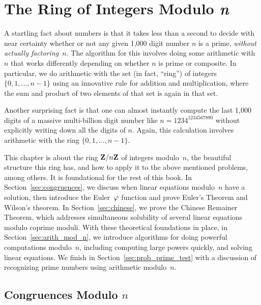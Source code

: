 \chapter{The Ring of Integers Modulo {\em n}}\label{ch:cong}
A startling fact about numbers is that it takes less than a second to
decide with near certainty whether or not any given 1,000 digit number
$n$ is a prime, {\em without actually factoring~$n$}.  The algorithm
for this involves doing some arithmetic with $n$ that works
differently depending on whether $n$ is prime or composite.  In
particular, we do arithmetic with the set (in fact, ``ring'') of
integers $\{0,1,\ldots, n-1\}$ using an innovative rule for addition
and multiplication, where the sum and product of two elements of that
set is again in that set.

Another surprising fact is that one can almost instantly compute the
last 1,000 digits of a massive multi-billion digit number like $n =
1234^{1234567890}$ without explicitly writing down all the digits of
$n$.  Again, this calculation involves arithmetic with the ring
$\{0,1,\ldots, n-1\}$.

This chapter is about the ring $\mathbf{Z}/n\mathbf{Z}{}$ of integers modulo~$n$, the
beautiful structure this ring has, and how to apply it to the above
mentioned problems, among others. It is foundational
for the rest of this book. In Section~\ref{sec:congruences}, we discuss
when linear equations modulo~$n$ have a solution, then introduce the
Euler~$\varphi$ function and prove Euler's Theorem and Wilson's theorem.
In Section~\ref{sec:chinese}, we prove the Chinese Remainer
Theorem, which addresses simultaneous solubility of several linear
equations modulo coprime moduli.  With these theoretical foundations
in place, in Section~\ref{sec:arith_mod_n}, we introduce algorithms for
doing powerful computations modulo~$n$, including computing large
powers quickly, and solving linear equations.  We finish in
Section~\ref{sec:prob_prime_test} with a discussion of recognizing
prime numbers using arithmetic modulo~$n$.


\section{Congruences Modulo $n$}
\label{sec:congruences}

